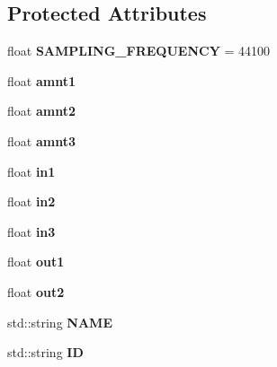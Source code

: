\subsection*{Protected Attributes}
\begin{DoxyCompactItemize}
\item 
float {\bfseries S\+A\+M\+P\+L\+I\+N\+G\+\_\+\+F\+R\+E\+Q\+U\+E\+N\+CY} = 44100\hypertarget{classunit_1_1UGen_af570ad383b680b2c79209b6ab28d010d}{}\label{classunit_1_1UGen_af570ad383b680b2c79209b6ab28d010d}

\item 
float {\bfseries amnt1}\hypertarget{classunit_1_1UGen_a4691cf88e3711c22617c11fc3ea3848e}{}\label{classunit_1_1UGen_a4691cf88e3711c22617c11fc3ea3848e}

\item 
float {\bfseries amnt2}\hypertarget{classunit_1_1UGen_a5e71a2e764029b4909c7e8535922e4b3}{}\label{classunit_1_1UGen_a5e71a2e764029b4909c7e8535922e4b3}

\item 
float {\bfseries amnt3}\hypertarget{classunit_1_1UGen_a14ebb8261a700f961c2d7808609470fe}{}\label{classunit_1_1UGen_a14ebb8261a700f961c2d7808609470fe}

\item 
float {\bfseries in1}\hypertarget{classunit_1_1UGen_aaf1873ae9668c6f1b37cae635bd40037}{}\label{classunit_1_1UGen_aaf1873ae9668c6f1b37cae635bd40037}

\item 
float {\bfseries in2}\hypertarget{classunit_1_1UGen_aed559bb431c46fe308560bd81756d169}{}\label{classunit_1_1UGen_aed559bb431c46fe308560bd81756d169}

\item 
float {\bfseries in3}\hypertarget{classunit_1_1UGen_aa774e90c8fc597e3eb84889632cf23df}{}\label{classunit_1_1UGen_aa774e90c8fc597e3eb84889632cf23df}

\item 
float {\bfseries out1}\hypertarget{classunit_1_1UGen_a90ba3b9008a6d8386035db3dee502217}{}\label{classunit_1_1UGen_a90ba3b9008a6d8386035db3dee502217}

\item 
float {\bfseries out2}\hypertarget{classunit_1_1UGen_a779961bf3971a9f4c85d292dbb6d6d78}{}\label{classunit_1_1UGen_a779961bf3971a9f4c85d292dbb6d6d78}

\item 
std\+::string {\bfseries N\+A\+ME}\hypertarget{classunit_1_1UGen_ae468f7e763da88da4389b8bdbc306459}{}\label{classunit_1_1UGen_ae468f7e763da88da4389b8bdbc306459}

\item 
std\+::string {\bfseries ID}\hypertarget{classunit_1_1UGen_ab8d5acd179e175cc787ac43a49b68c29}{}\label{classunit_1_1UGen_ab8d5acd179e175cc787ac43a49b68c29}

\end{DoxyCompactItemize}


